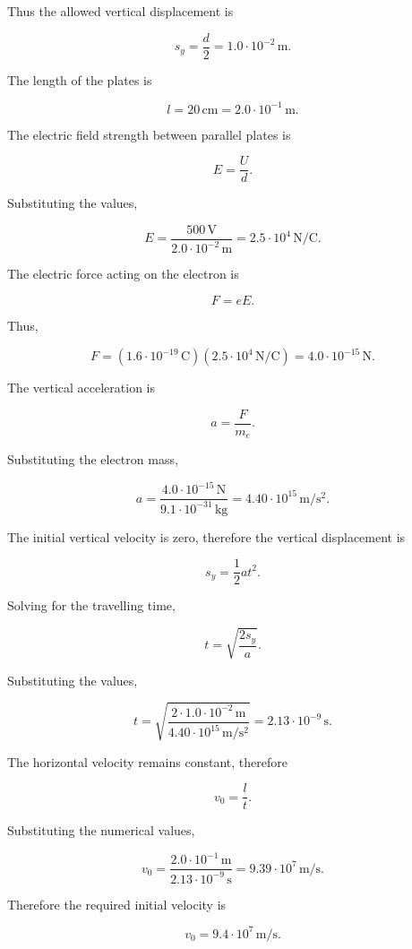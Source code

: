 \documentclass[letterpaper,12pt]{letter}
\begin{document}
\begin{enumerate}[label=\Roman*.]
\begin{enumerate}[label=\arabic*.]
Thus the allowed vertical displacement is

$$s_y=\frac{d}{2}=1.0\cdot10^{-2}\,\mathrm{m}.$$

The length of the plates is

$$l=20\,\mathrm{cm}=2.0\cdot10^{-1}\,\mathrm{m}.$$

The electric field strength between parallel plates is

$$E=\frac{U}{d}.$$

Substituting the values,

$$E=\frac{500\,\mathrm{V}}{2.0\cdot10^{-2}\,\mathrm{m}}=2.5\cdot10^4\,\mathrm{N/C}.$$

The electric force acting on the electron is

$$F=eE.$$

\pagebreak
Thus,

$$F=(1.6\cdot10^{-19}\,\mathrm{C})(2.5\cdot10^4\,\mathrm{N/C})=4.0\cdot10^{-15}\,\mathrm{N}.$$

The vertical acceleration is

$$a=\frac{F}{m_e}.$$

Substituting the electron mass,

$$a=\frac{4.0\cdot10^{-15}\,\mathrm{N}}{9.1\cdot10^{-31}\,\mathrm{kg}}=4.40\cdot10^{15}\,\mathrm{m/s^2}.$$

The initial vertical velocity is zero, therefore the vertical displacement is

$$s_y=\frac{1}{2}at^2.$$

Solving for the travelling time,

$$t=\sqrt{\frac{2s_y}{a}}.$$

Substituting the values,

$$t=\sqrt{\frac{2\cdot1.0\cdot10^{-2}\,\mathrm{m}}{4.40\cdot10^{15}\,\mathrm{m/s^2}}}=2.13\cdot10^{-9}\,\mathrm{s}.$$

The horizontal velocity remains constant, therefore

$$v_0=\frac{l}{t}.$$

Substituting the numerical values,

$$v_0=\frac{2.0\cdot10^{-1}\,\mathrm{m}}{2.13\cdot10^{-9}\,\mathrm{s}}=9.39\cdot10^7\,\mathrm{m/s}.$$

Therefore the required initial velocity is

$$\boxed{v_0=9.4\cdot10^7\,\mathrm{m/s}}.$$

\end{enumerate}

\end{enumerate}
\end{document}
